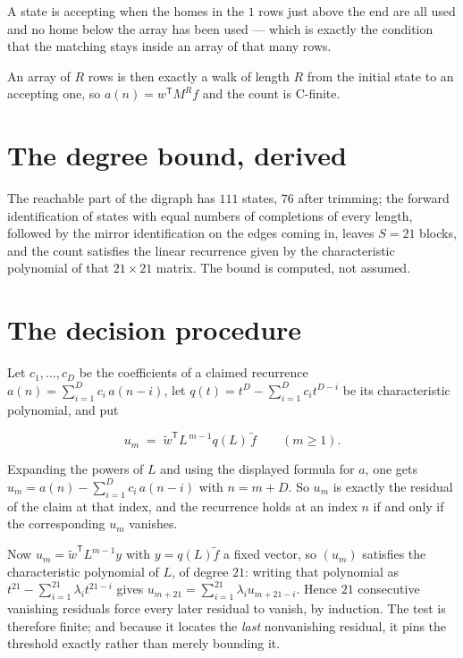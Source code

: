 \documentclass[11pt]{article}
\theoremstyle{definition}
\begin{document}
A state is accepting when the homes in the $1$ rows just above the end are all used and no home below the array has been used --- which is exactly the condition that the matching stays inside an array of that many rows.

An array of $R$ rows is then exactly a walk of length $R$ from the initial state to an accepting one, so $a(n) = w^{\mathsf T}M^{R}f$ and the count is C-finite.

\section{The degree bound, derived}

The reachable part of the digraph has $111$ states, $76$ after trimming; the forward identification of states with equal numbers of completions of every length, followed by the mirror identification on the edges coming in, leaves $S = 21$ blocks, and the count satisfies the linear recurrence given by the characteristic polynomial of that $21\times21$ matrix. The bound is computed, not assumed.

\section{The decision procedure}

Let $c_1,\dots,c_D$ be the coefficients of a claimed recurrence $a(n) = \sum_{i=1}^{D} c_i\,a(n-i)$, let $q(t) = t^{D} - \sum_{i=1}^{D} c_i t^{D-i}$ be its characteristic polynomial, and put

\[u_m \;=\; \tilde w^{\mathsf T} L^{\,m-1} q(L)\,\tilde f \qquad (m \ge 1).\]

Expanding the powers of $L$ and using the displayed formula for $a$, one gets $u_m = a(n) - \sum_{i=1}^{D} c_i\,a(n-i)$ with $n = m + D$. So $u_m$ is exactly the residual of the claim at that index, and the recurrence holds at an index $n$ if and only if the corresponding $u_m$ vanishes.

Now $u_m = \tilde w^{\mathsf T} L^{m-1} y$ with $y = q(L)\tilde f$ a fixed vector, so $(u_m)$ satisfies the characteristic polynomial of $L$, of degree $21$: writing that polynomial as $t^{21} - \sum_{i=1}^{21} \lambda_i t^{21-i}$ gives $u_{m+21} = \sum_{i=1}^{21} \lambda_i u_{m+21-i}$. Hence $21$ consecutive vanishing residuals force every later residual to vanish, by induction. The test is therefore finite; and because it locates the {\itshape last} nonvanishing residual, it pins the threshold exactly rather than merely bounding it.
\end{document}
